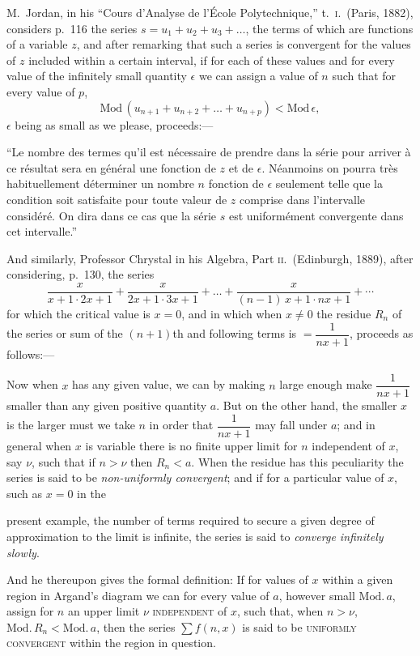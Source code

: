 \documentclass[11pt]{article}
\begin{document}
M.\ Jordan, in his ``Cours d'Analyse de l'\'Ecole Polytechnique,'' t.\ \textsc{i}.\ (Paris, 1882), considers p.\ 116 the series $s = u_1 + u_2 + u_3 + \ldots$, the terms of which are functions of a variable $z$, and after remarking that such a series is convergent for the values of $z$ included within a certain interval, if for each of these values and for every value of the infinitely small quantity $\epsilon$ we can assign a value of $n$ such that for every value of $p$,
\[
\mathrm{Mod}\,(u_{n+1} + u_{n+2} + \ldots + u_{n+p}) < \mathrm{Mod}\,\epsilon,
\]
$\epsilon$ being as small as we please, proceeds:---

``Le nombre des termes qu'il est n\'ecessaire de prendre dans la s\'erie pour arriver \`a ce r\'esultat sera en g\'en\'eral une fonction de $z$ et de $\epsilon$. N\'eanmoins on pourra tr\`es habituellement d\'eterminer un nombre $n$ fonction de $\epsilon$ seulement telle que la condition soit satisfaite pour toute valeur de $z$ comprise dans l'intervalle consid\'er\'e. On dira dans ce cas que la s\'erie $s$ est uniform\'ement convergente dans cet intervalle.''

And similarly, Professor Chrystal in his Algebra, Part \textsc{ii}.\ (Edinburgh, 1889), after considering, p.\ 130, the series
\[
\frac{x}{x + 1\cdot 2x + 1} + \frac{x}{2x + 1\cdot 3x + 1} + \ldots + \frac{x}{(n - 1)\, x + 1\cdot n x + 1} + \cdots
\]
for which the critical value is $x = 0$, and in which when $x \ne 0$ the residue $R_n$ of the series or sum of the $(n+1)$th and following terms is $= \dfrac{1}{nx + 1}$, proceeds as follows:---

Now when $x$ has any given value, we can by making $n$ large enough make $\dfrac{1}{nx+1}$ smaller than any given positive quantity $a$. But on the other hand, the smaller $x$ is the larger must we take $n$ in order that $\dfrac{1}{nx+1}$ may fall under $a$; and in general when $x$ is variable there is no finite upper limit for $n$ independent of $x$, say $\nu$, such that if $n > \nu$ then $R_n < a$. When the residue has this peculiarity the series is said to be \textit{non-uniformly convergent}; and if for a particular value of $x$, such as $x = 0$ in the

present example, the number of terms required to secure a given degree of approximation to the limit is infinite, the series is said to \textit{converge infinitely slowly}.

And he thereupon gives the formal definition: If for values of $x$ within a given region in Argand's diagram we can for every value of $a$, however small $\mathrm{Mod}.\,a$, assign for $n$ an upper limit $\nu$ \textsc{independent} of $x$, such that, when $n > \nu$, $\mathrm{Mod}.\,R_n < \mathrm{Mod}.\,a$, then the series $\sum f(n, x)$ is said to be \textsc{uniformly convergent} within the region in question.
\end{document}
